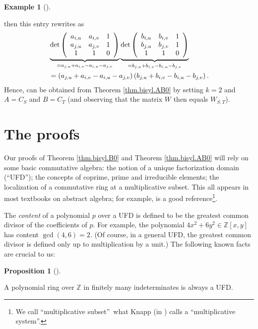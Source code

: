 \documentclass[numbers=enddot,12pt,final,onecolumn,notitlepage]{scrartcl}%
\theoremstyle{definition}
\newtheorem{prop}[theo]{Proposition}
\newenvironment{proposition}[1][]
{\begin{prop}[#1]\begin{leftbar}}
{\end{leftbar}\end{prop}}
\newtheorem{exam}[theo]{Example}
\newenvironment{example}[1][]
{\begin{exam}[#1]\begin{leftbar}}
{\end{leftbar}\end{exam}}
\begin{document}
\begin{example}
then this entry rewrites as%
\begin{align*}
&  \underbrace{\det\left(
\begin{array}
[c]{ccc}%
a_{i,u} & a_{i,v} & 1\\
a_{j,u} & a_{j,v} & 1\\
1 & 1 & 0
\end{array}
\right)  }_{=a_{j,u}+a_{i,v}-a_{i,u}-a_{j,v}}\underbrace{\det\left(
\begin{array}
[c]{ccc}%
b_{i,u} & b_{i,v} & 1\\
b_{j,u} & b_{j,v} & 1\\
1 & 1 & 0
\end{array}
\right)  }_{=b_{j,u}+b_{i,v}-b_{i,u}-b_{j,v}}\\
&  =\left(  a_{j,u}+a_{i,v}-a_{i,u}-a_{j,v}\right)  \left(  b_{j,u}%
+b_{i,v}-b_{i,u}-b_{j,v}\right)  .
\end{align*}
Hence, \cite[Theorem 10]{GriOlv18} can be obtained from Theorem
\ref{thm.bisyl.AB0} by setting $k=2$ and $A=C_{S}$ and $B=C_{T}$ (and
observing that the matrix $W$ then equals $W_{S,T}$).
\end{example}


\section{The proofs}

Our proofs of Theorem \ref{thm.bisyl.B0} and Theorem \ref{thm.bisyl.AB0} will
rely on some basic commutative algebra: the notion of a unique factorization
domain (\textquotedblleft UFD\textquotedblright); the concepts of coprime,
prime and irreducible elements; the localization of a commutative ring at a
multiplicative subset. This all appears in most textbooks on abstract algebra;
for example, \cite[Sections VIII.4 and VIII.10]{Knapp16} is a good
reference\footnote{We call \textquotedblleft multiplicative
subset\textquotedblright\ what Knapp (in \cite[Section VIII.10]{Knapp16})
calls a \textquotedblleft multiplicative system\textquotedblright.}.

The \textit{content} of a polynomial $p$ over a UFD is defined to be the
greatest common divisor of the coefficients of $p$. For example, the
polynomial $4x^{2}+6y^{2}\in\mathbb{Z}\left[  x,y\right]  $ has content
$\gcd\left(  4,6\right)  =2$. (Of course, in a general UFD, the greatest
common divisor is defined only up to multiplication by a unit.) The following
known facts are crucial to us:

\begin{proposition}
\label{prop.poly.Zufd}A polynomial ring over $\mathbb{Z}$ in finitely many
indeterminates is always a UFD.
\end{proposition}
\end{document}
